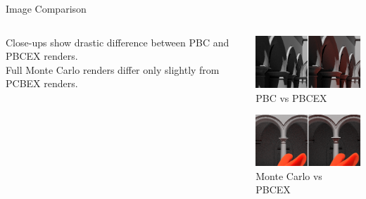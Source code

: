 \documentclass[10pt,compress,professionalfont]{beamer}
\begin{document}
\begin{frame}{Image Comparison}


    \begin{columns}
        \begin{column}{0.5\textwidth}
            Close-ups show drastic difference between PBC and PBCEX renders.\\
            \vspace{8mm}
            Full Monte Carlo renders differ only slightly from PCBEX renders.
        \end{column}
        \begin{column}{0.5\textwidth}

            {\centering
            \includegraphics[width=50mm]{../img/compare_trad_corrected}\\
            {\centering\scriptsize PBC vs PBCEX\\}
            
            \vspace{5mm}

            \includegraphics[width=50mm]{../img/compare1_corrected}\\
            {\centering\scriptsize Monte Carlo vs PBCEX\\}
            }
        \end{column}
    \end{columns}


\end{frame}
\end{document}
